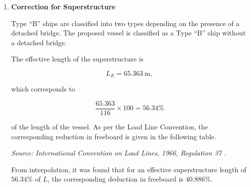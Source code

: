 \documentclass[12pt,a4paper,twoside]{report}
\begin{document}
\begin{enumerate}[\alph*)]
    \item \textbf{Correction for Superstructure}

    Type ``B'' ships are classified into two types depending on the
    presence of a detached bridge. The proposed vessel is classified
    as a Type ``B'' ship without a detached bridge.

    The effective length of the superstructure is

    \[
    L_E = 65.363~\mathrm{m},
    \]

    which corresponds to

    \[
    \frac{65.363}{116}\times100
    = 56.34\%
    \]

    of the length of the vessel. As per the Load Line Convention,
    the corresponding reduction in freeboard is given in the
    following table.


\begin{table}[htbp]
    \centering
    \caption{Percentage of Deduction for Type ``B'' Ships}
    \label{tab:freeboard_deduction_type_b}
    
    
    \vspace{2mm}
    
    \footnotesize
    \textit{Source: International Convention on Load Lines, 1966,
    Regulation 37 \cite{international_load_lines_1966}.}
\end{table}
From interpolation, it was found that for an effective superstructure
length of $56.34\%$ of $L$, the corresponding deduction in freeboard is
$40.886\%$.


\end{enumerate}
\end{document}
